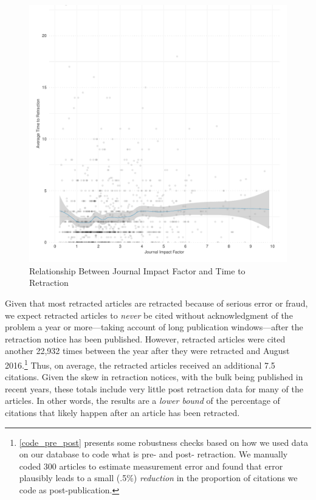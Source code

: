 \documentclass[12pt, letterpaper]{article}
\begin{document}
\begin{figure}[H]
\centering
\includegraphics[scale=.7]{../figs/jif_time_to_retraction.pdf}
\caption{Relationship Between Journal Impact Factor and Time to Retraction}
\label{fig:jif_ttr}
\end{figure}

Given that most retracted articles are retracted because of serious error or fraud, we expect retracted articles to \textit{never} be cited without acknowledgment of the problem a year or more---taking account of long publication windows---after the retraction notice has been published. However, retracted articles were cited another 22,932 times between the year after they were retracted and August 2016.\footnote{\ref{code_pre_post} presents some robustness checks based on how we used data on our database to code what is pre- and post- retraction. We manually coded 300 articles to estimate measurement error and found that error plausibly leads to a small (.5\%) \textit{reduction} in the proportion of citations we code as post-publication.} Thus, on average, the retracted articles received an additional 7.5 citations. Given the skew in retraction notices, with the bulk being published in recent years, these totals include very little post retraction data for many of the articles. In other words, the results are a \textit{lower bound} of the percentage of citations that likely happen after an article has been retracted.
\end{document}
